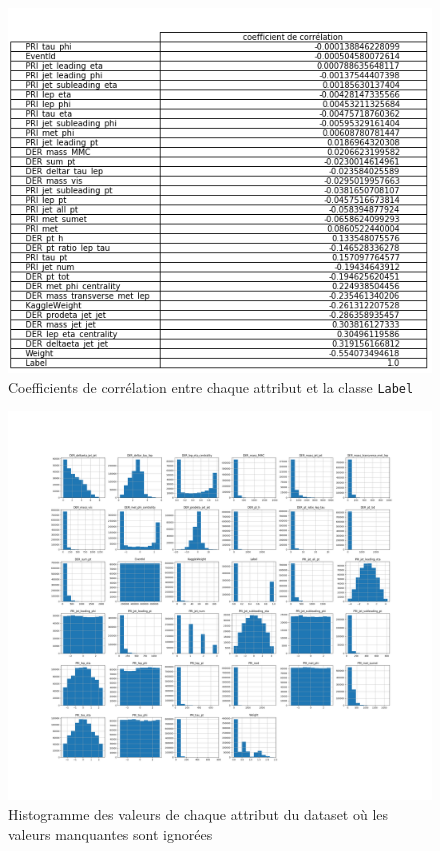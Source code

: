\documentclass[12pt]{article}
\begin{document}
\begin{figure}[H]
    \center
    \includegraphics[width=\textwidth]{images/table_corr.png}
    \caption{Coefficients de corrélation entre chaque attribut et la classe
    \texttt{Label}}
    \label{img:table-corr}
\end{figure}

\begin{figure}[H]
    \center 
    \includegraphics[width=\textwidth]{images/histogrammes.png}
    \caption{Histogramme des valeurs de chaque attribut du dataset où les
    valeurs manquantes sont ignorées}
    \label{img:hist}
\end{figure}
\end{document}
